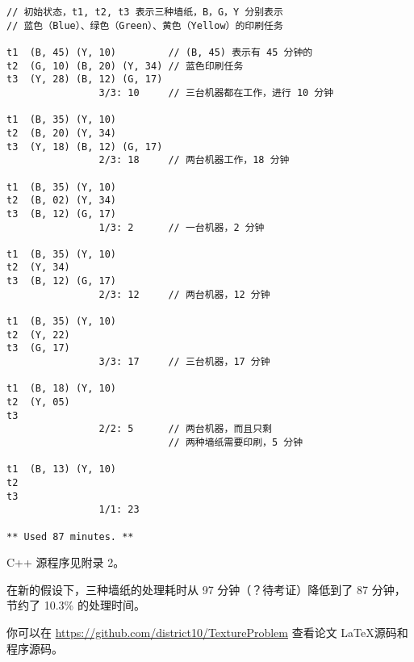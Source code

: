 \documentclass[bwprint]{cumcmthesis}    %
\begin{document}
\vspace{1.5cm}
\begin{lstlisting}[frame=single]
// 初始状态，t1, t2, t3 表示三种墙纸，B，G，Y 分别表示
// 蓝色（Blue）、绿色（Green）、黄色（Yellow）的印刷任务

t1  (B, 45) (Y, 10)         // (B, 45) 表示有 45 分钟的
t2  (G, 10) (B, 20) (Y, 34) // 蓝色印刷任务
t3  (Y, 28) (B, 12) (G, 17)
                3/3: 10     // 三台机器都在工作，进行 10 分钟

t1  (B, 35) (Y, 10)
t2  (B, 20) (Y, 34)
t3  (Y, 18) (B, 12) (G, 17)
                2/3: 18     // 两台机器工作，18 分钟

t1  (B, 35) (Y, 10)
t2  (B, 02) (Y, 34)
t3  (B, 12) (G, 17)
                1/3: 2      // 一台机器，2 分钟

t1  (B, 35) (Y, 10)
t2  (Y, 34)
t3  (B, 12) (G, 17)
                2/3: 12     // 两台机器，12 分钟

t1  (B, 35) (Y, 10)
t2  (Y, 22)
t3  (G, 17)
                3/3: 17     // 三台机器，17 分钟

t1  (B, 18) (Y, 10)
t2  (Y, 05)
t3
                2/2: 5      // 两台机器，而且只剩
                            // 两种墙纸需要印刷，5 分钟

t1  (B, 13) (Y, 10)
t2
t3
                1/1: 23

** Used 87 minutes. **
\end{lstlisting}

C++ 源程序见附录 2。

在新的假设下，三种墙纸的处理耗时从 97 分钟（？待考证）降低到了 87 分钟，节约了
10.3\% 的处理时间。

你可以在 \href{https://github.com/district10/TextureProblem}{https://github.com/district10/TextureProblem}
查看论文 \LaTeX 源码和程序源码。
\end{document}
